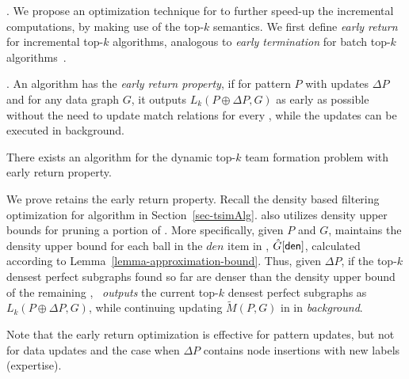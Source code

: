 
. 
We propose an optimization technique for \incp to further speed-up the incremental computations, by making use of the top-$k$ semantics.
%
We first define {\em early return} for incremental top-$k$ algorithms, analogous to {\em early termination} for batch top-$k$ algorithms~\cite{FaginLotem03}.


. An algorithm has the {\em early return property},
if for pattern $P$ with updates $\Delta P$ and for any data graph $G$,
it outputs $L_k(P\oplus \Delta P, G)$ as early as possible without the need to update match relations for every \affballx,
while the updates can be executed in background.


\begin{prop}
\label{prop-early-return}
There exists an algorithm for the dynamic top-$k$ team formation problem with early return property.
\end{prop}


We prove \incp retains the early return property.
Recall the density based filtering optimization for algorithm \optgrouprec in Section~\ref{sec-tsimAlg}.
\incp also utilizes density upper bounds for pruning a portion of \affballsx.
More specifically, given $P$ and $G$, \incp maintains the density upper bound for each ball in the $den$ item in \bs, \ie $\hat{G}{}[{\mathsf{den}}]$,
calculated according to Lemma~\ref{lemma-approximation-bound}.
Thus, given $\Delta P$, if the top-$k$ densest perfect subgraphs found so far are denser than the density upper bound of the remaining \affballsx,
\incp\ {\em outputs} the current top-$k$ densest perfect subgraphs as $L_k(P\oplus \Delta P, G)$,
while continuing updating $\tilde{M}(P, G)$ in \affballsx in {\em background}.

Note that the early return optimization is  effective for pattern updates, but not for data updates and the case when $\Delta P$ contains node insertions with new labels (expertise).

